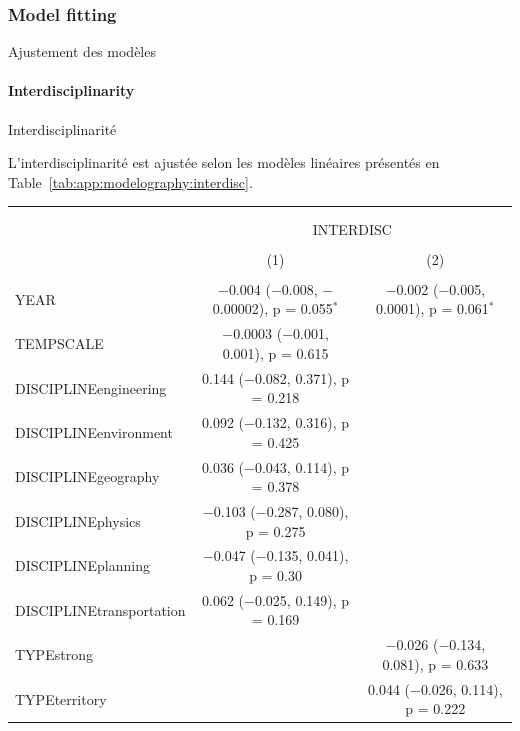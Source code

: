 \subsubsection{Model fitting}{Ajustement des modèles}


\paragraph{Interdisciplinarity}{Interdisciplinarité}


L'interdisciplinarité est ajustée selon les modèles linéaires présentés en Table~\ref{tab:app:modelography:interdisc}.



\begin{table}%
\begin{tabular}{@{\extracolsep{5pt}}lcc} 
\footnotesize
\\[-1.8ex]\hline 
\hline \\[-1.8ex] 
\\[-1.8ex] & \multicolumn{2}{c}{INTERDISC} \\ 
\\[-1.8ex] & (1) & (2)\\ 
\hline \\[-1.8ex] 
 YEAR & $-$0.004 ($-$0.008, $-$0.00002), p = 0.055$^{*}$ & $-$0.002 ($-$0.005, 0.0001), p = 0.061$^{*}$ \\ 
  TEMPSCALE & $-$0.0003 ($-$0.001, 0.001), p = 0.615 &  \\ 
  DISCIPLINEengineering & 0.144 ($-$0.082, 0.371), p = 0.218 &  \\ 
  DISCIPLINEenvironment & 0.092 ($-$0.132, 0.316), p = 0.425 &  \\ 
  DISCIPLINEgeography & 0.036 ($-$0.043, 0.114), p = 0.378 &  \\ 
  DISCIPLINEphysics & $-$0.103 ($-$0.287, 0.080), p = 0.275 &  \\ 
  DISCIPLINEplanning & $-$0.047 ($-$0.135, 0.041), p = 0.30 &  \\ 
  DISCIPLINEtransportation & 0.062 ($-$0.025, 0.149), p = 0.169 &  \\ 
  TYPEstrong &  & $-$0.026 ($-$0.134, 0.081), p = 0.633 \\ 
  TYPEterritory &  & 0.044 ($-$0.026, 0.114), p = 0.222 \\ 

\end{tabular}
\end{table}
